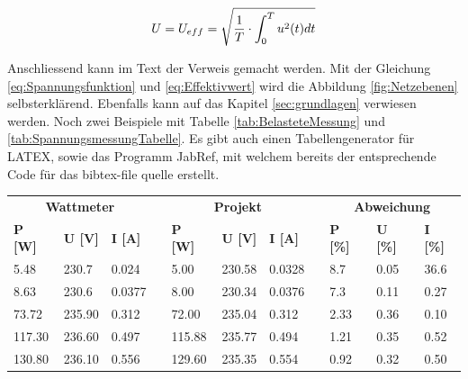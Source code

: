 \begin{equation}
\centering
U = U_{eff} = \sqrt{\dfrac{1}{T}\cdot \int_0^T u^2(t) dt}
\label{eq:Effektivwert}
\end{equation}

Anschliessend kann im Text der Verweis gemacht werden. Mit der Gleichung \ref{eq:Spannungsfunktion} und \ref{eq:Effektivwert} wird die Abbildung \ref{fig:Netzebenen} selbsterklärend. Ebenfalls kann auf das Kapitel \ref{sec:grundlagen} verwiesen werden. Noch zwei Beispiele mit Tabelle \ref{tab:BelasteteMessung} und \ref{tab:SpannungsmessungTabelle}. Es gibt auch einen Tabellengenerator für LATEX, sowie das Programm JabRef, mit welchem bereits der entsprechende Code für das bibtex-file quelle erstellt.

\begin{table}[htbp]
\centering
\begin{tabular}{lllllllllll}
\multicolumn{3}{c}{\textbf{Wattmeter}}                       & \textbf{} & \multicolumn{3}{c}{\textbf{Projekt}}                         & \textbf{} & \multicolumn{3}{c}{\textbf{Abweichung}}                         \\
\textbf{P {[}W{]}} & \textbf{U {[}V{]}} & \textbf{I {[}A{]}} & \textbf{} & \textbf{P {[}W{]}} & \textbf{U {[}V{]}} & \textbf{I {[}A{]}} & \textbf{} & \textbf{P {[}\%{]}} & \textbf{U {[}\%{]}} & \textbf{I {[}\%{]}} \\ \cline{1-3} \cline{5-7} \cline{9-11} 
5.48             & 230.7             & 0.024              &           & 5.00             & 230.58             & 0.0328              &           & 8.7                & 0.05                & 36.6                \\
8.63              & 230.6             & 0.0377              &           & 8.00              & 230.34             & 0.0376              &           & 7.3                & 0.11                & 0.27                \\
73.72              & 235.90             & 0.312              &           & 72.00              & 235.04             & 0.312              &           & 2.33                & 0.36                & 0.10                \\
117.30             & 236.60             & 0.497              &           & 115.88             & 235.77             & 0.494              &           & 1.21                & 0.35                & 0.52                \\
130.80             & 236.10             & 0.556              &           & 129.60             & 235.35             & 0.554              &           & 0.92                & 0.32                & 0.50                \\

\end{tabular}
\end{table}
